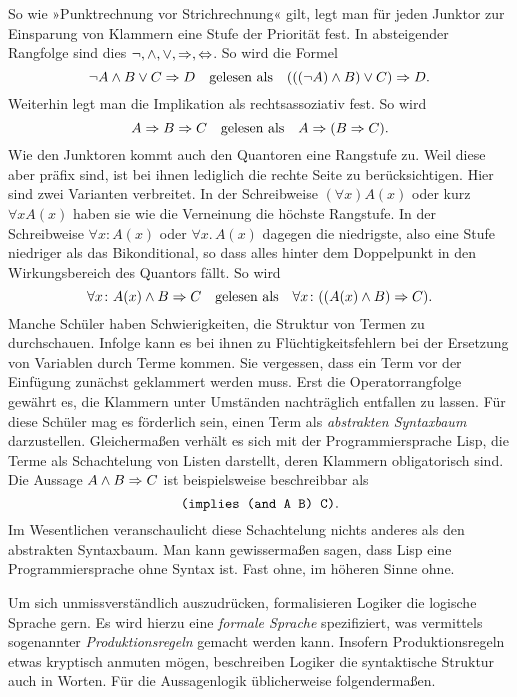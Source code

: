 So wie »Punktrechnung vor Strichrechnung« gilt, legt man für jeden
Junktor zur Einsparung von Klammern eine Stufe der Priorität fest. In
absteigender Rangfolge sind dies ${\lnot}, {\land}, {\lor}, {\Rightarrow},
{\Leftrightarrow}$. So wird die Formel
\[\lnot A\land B\lor C\Rightarrow D\quad\text{gelesen als}\quad
(((\lnot A)\land B)\lor C)\Rightarrow D.\]
Weiterhin legt man die Implikation als rechtsassoziativ%
 fest. So wird
\[A\Rightarrow B\Rightarrow C\quad\text{gelesen als}\quad A\Rightarrow (B\Rightarrow C).\]
Wie den Junktoren kommt auch den Quantoren eine Rangstufe zu. Weil
diese aber präfix sind, ist bei ihnen lediglich die rechte Seite zu
berücksichtigen. Hier sind zwei Varianten verbreitet. In der
Schreibweise $(\forall x)A(x)$ oder kurz $\forall xA(x)$ haben
sie wie die Verneinung die höchste Rangstufe. In der Schreibweise
$\forall x\colon A(x)$ oder $\forall x.\, A(x)$ dagegen die niedrigste,
also eine Stufe niedriger als das Bikonditional, so dass alles
hinter dem Doppelpunkt in den Wirkungsbereich des Quantors fällt.
So wird
\[\forall x\colon A(x)\land B\Rightarrow C\quad\text{gelesen als}\quad
\forall x\colon ((A(x)\land B)\Rightarrow C).\]
Manche Schüler haben Schwierigkeiten, die Struktur von Termen zu
durchschauen. Infolge kann es bei ihnen zu Flüchtigkeitsfehlern
bei der Ersetzung von Variablen durch Terme kommen. Sie vergessen,
dass ein Term vor der Einfügung zunächst geklammert werden muss.
Erst die Operatorrangfolge gewährt es, die Klammern unter Umständen
nachträglich entfallen zu lassen. Für diese Schüler mag es förderlich
sein, einen Term als \emph{abstrakten Syntaxbaum} darzustellen.
Gleichermaßen verhält es sich mit der Programmiersprache Lisp, die
Terme als Schachtelung von Listen darstellt, deren Klammern
obligatorisch sind.  Die Aussage $A\land B\Rightarrow C$ ist beispielsweise
beschreibbar als
\[\text{\texttt{(implies (and A B) C)}}.\]
Im Wesentlichen veranschaulicht diese Schachtelung
nichts anderes als den abstrakten Syntaxbaum. Man kann gewissermaßen
sagen, dass Lisp eine Programmiersprache ohne Syntax ist. Fast ohne,
im höheren Sinne ohne.

Um sich unmissverständlich auszudrücken, formalisieren Logiker die
logische Sprache gern. Es wird hierzu eine \emph{formale Sprache} spezifiziert,
was vermittels sogenannter \emph{Produktionsregeln} gemacht werden kann.
Insofern Produktionsregeln etwas kryptisch anmuten mögen, beschreiben
Logiker die syntaktische Struktur auch in Worten.
Für die Aussagenlogik üblicherweise folgendermaßen.

